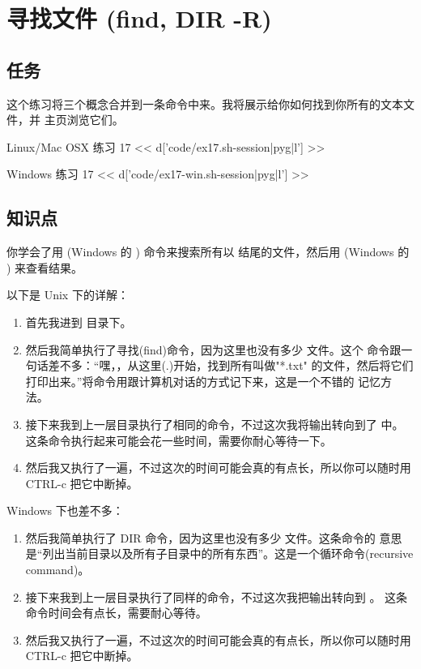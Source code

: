 \chapter{寻找文件 (find, DIR -R)}

\section{任务}

这个练习将三个概念合并到一条命令中来。我将展示给你如何找到你所有的文本文件，并
主页浏览它们。

\begin{code}{Linux/Mac OSX 练习 17}
<< d['code/ex17.sh-session|pyg|l'] >>
\end{code}

\begin{code}{Windows 练习 17}
<< d['code/ex17-win.sh-session|pyg|l'] >>
\end{code}

\section{知识点}

你学会了用  (Windows 的 ) 命令来搜索所有以   
结尾的文件，然后用  (Windows 的 ) 来查看结果。

以下是 Unix 下的详解：

\begin{enumerate}
\item 首先我进到  目录下。
\item 然后我简单执行了寻找(find)命令，因为这里也没有多少  文件。这个
    命令跟一句话差不多：“嘿，，从这里(.)开始，找到所有叫做"*.txt"
    的文件，然后将它们打印出来。”将命令用跟计算机对话的方式记下来，这是一个不错的
    记忆方法。
\item 接下来我到上一层目录执行了相同的命令，不过这次我将输出转向到了  
    中。这条命令执行起来可能会花一些时间，需要你耐心等待一下。
\item 然后我又执行了一遍，不过这次的时间可能会真的有点长，所以你可以随时用  CTRL-c 
    把它中断掉。
\end{enumerate}

Windows 下也差不多：

\begin{enumerate}
\item 然后我简单执行了 DIR 命令，因为这里也没有多少  文件。这条命令的
    意思是“列出当前目录以及所有子目录中的所有东西”。这是一个循环命令(recursive command)。
\item 接下来我到上一层目录执行了同样的命令，不过这次我把输出转向到 。
    这条命令时间会有点长，需要耐心等待。
\item 然后我又执行了一遍，不过这次的时间可能会真的有点长，所以你可以随时用  CTRL-c 
    把它中断掉。
\end{enumerate}

